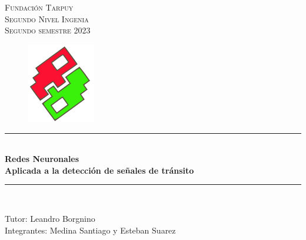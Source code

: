 \documentclass[13pt, letterpaper, oneside]{article}
\begin{document}

	\begin{titlepage}
	\newcommand{\HRule}{\rule{\linewidth}{0.5mm}}
	\center %
	\vspace*{4cm}
	\textsc{\Huge Fundación Tarpuy }\\[0.3cm]
	\textsc{\Large Segundo Nivel Ingenia}\\[0.2cm]
	\textsc{Segundo semestre 2023}\\[0.3cm]
	\begin{figure}[ht]
		\centering
		\includegraphics[height=3.5cm]{2}
	\end{figure}

	\HRule \\[0.8cm]
	{ \huge \bfseries Redes Neuronales}\\[0.4cm] %
	{ \large \bfseries Aplicada a la detección de señales de tránsito}\\[0.2cm]
	\HRule \\[1.0cm]
 

	\begin{minipage}{0.8\textwidth}
		\begin{center} \large
			Tutor: Leandro Borgnino \\[0.5cm]
			Integrantes: Medina Santiago y Esteban Suarez
		\end{center}
	\end{minipage}

	\vspace{1cm}
	\end{titlepage}

	\tableofcontents
	\pagebreak

	
\end{document}
